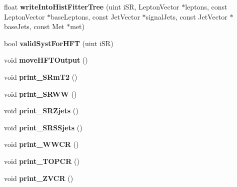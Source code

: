 \begin{DoxyCompactItemize}
\item 
\hypertarget{classSusy2LepAna_a1a0d2b619104ffc129b7378d0ad78aa3}{
float {\bfseries writeIntoHistFitterTree} (uint iSR, LeptonVector $\ast$leptons, const LeptonVector $\ast$baseLeptons, const JetVector $\ast$signalJets, const JetVector $\ast$baseJets, const Met $\ast$met)}
\label{classSusy2LepAna_a1a0d2b619104ffc129b7378d0ad78aa3}

\item 
\hypertarget{classSusy2LepAna_ae8dd26f0b33cb51f17c5154d8987d90a}{
bool {\bfseries validSystForHFT} (uint iSR)}
\label{classSusy2LepAna_ae8dd26f0b33cb51f17c5154d8987d90a}

\item 
\hypertarget{classSusy2LepAna_ac72ae5958184ca2594786e279466e51a}{
void {\bfseries moveHFTOutput} ()}
\label{classSusy2LepAna_ac72ae5958184ca2594786e279466e51a}

\item 
\hypertarget{classSusy2LepAna_ab92b69085553cec932f1d852828a27b1}{
void {\bfseries print\_\-SRmT2} ()}
\label{classSusy2LepAna_ab92b69085553cec932f1d852828a27b1}

\item 
\hypertarget{classSusy2LepAna_aa313308520befbf3059f31b50114a19d}{
void {\bfseries print\_\-SRWW} ()}
\label{classSusy2LepAna_aa313308520befbf3059f31b50114a19d}

\item 
\hypertarget{classSusy2LepAna_a94e9f02c276646d82833e45f20b75ec0}{
void {\bfseries print\_\-SRZjets} ()}
\label{classSusy2LepAna_a94e9f02c276646d82833e45f20b75ec0}

\item 
\hypertarget{classSusy2LepAna_a713ed7fec5d1c8cef9ec8db3740d0f99}{
void {\bfseries print\_\-SRSSjets} ()}
\label{classSusy2LepAna_a713ed7fec5d1c8cef9ec8db3740d0f99}

\item 
\hypertarget{classSusy2LepAna_ae98d6a9bd56a7a72a3e1a725a72d23ee}{
void {\bfseries print\_\-WWCR} ()}
\label{classSusy2LepAna_ae98d6a9bd56a7a72a3e1a725a72d23ee}

\item 
\hypertarget{classSusy2LepAna_a3b4a54efb897c0ff83001416b46c7b47}{
void {\bfseries print\_\-TOPCR} ()}
\label{classSusy2LepAna_a3b4a54efb897c0ff83001416b46c7b47}

\item 
\hypertarget{classSusy2LepAna_a8778301326d981a8cf1697761998f54a}{
void {\bfseries print\_\-ZVCR} ()}
\label{classSusy2LepAna_a8778301326d981a8cf1697761998f54a}


\end{DoxyCompactItemize}
